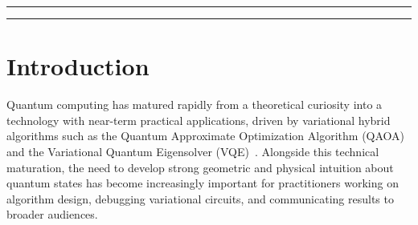 \documentclass{SciPost}
\begin{document}
\noindent\textcolor{white!90!black}{%
}


\linenumbers

\vspace{10pt}
\noindent\rule{\textwidth}{1pt}
\tableofcontents
\noindent\rule{\textwidth}{1pt}
\vspace{10pt}



\section{Introduction}
\label{sec:intro}

Quantum computing has matured rapidly from a theoretical curiosity into a
technology with near-term practical applications, driven by variational hybrid
algorithms such as the Quantum Approximate Optimization Algorithm
(QAOA)~\cite{Farhi2014} and the Variational Quantum Eigensolver
(VQE)~\cite{Peruzzo2014}.
Alongside this technical maturation, the need to develop strong geometric and
physical intuition about quantum states has become increasingly important for
practitioners working on algorithm design, debugging variational circuits, and
communicating results to broader audiences.
\end{document}
